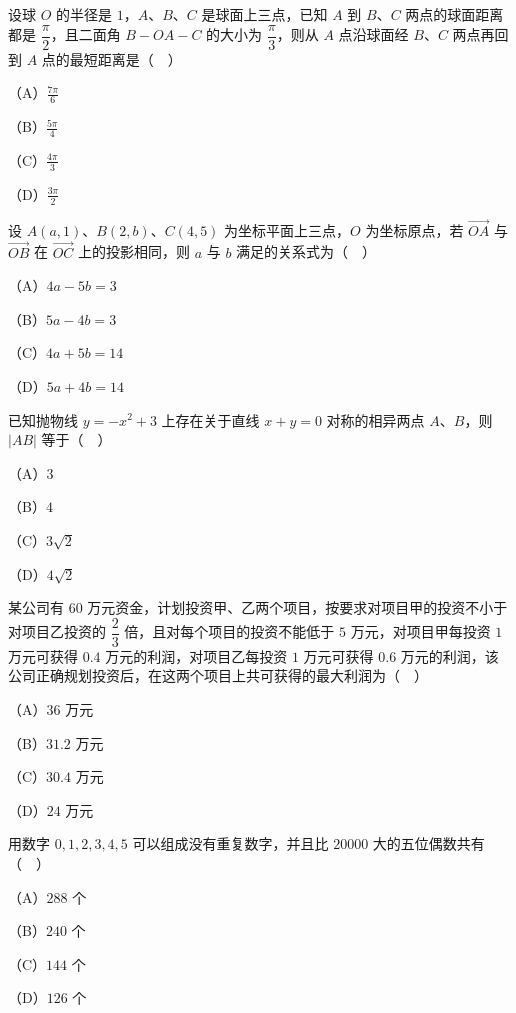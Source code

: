 \begin{question}
设球 $O$ 的半径是 $1$，$A$、$B$、$C$ 是球面上三点，已知 $A$ 到 $B$、$C$ 两点的球面距离都是 $\dfrac{\pi}{2}$，且二面角 $B-OA-C$ 的大小为 $\dfrac{\pi}{3}$，则从 $A$ 点沿球面经 $B$、$C$ 两点再回到 $A$ 点的最短距离是（　）
\nopagebreak[4]
\begin{center}\end{center}
\nopagebreak[4]
（A）$\frac{7\pi}{6}$

（B）$\frac{5\pi}{4}$

（C）$\frac{4\pi}{3}$

（D）$\frac{3\pi}{2}$

\end{question}
\begin{question}
设 $A(a,1)$、$B(2,b)$、$C(4,5)$ 为坐标平面上三点，$O$ 为坐标原点，若 $\overrightarrow{OA}$ 与 $\overrightarrow{OB}$ 在 $\overrightarrow{OC}$ 上的投影相同，则 $a$ 与 $b$ 满足的关系式为（　）

（A）$4a-5b=3$

（B）$5a-4b=3$

（C）$4a+5b=14$

（D）$5a+4b=14$

\end{question}
\begin{question}
已知抛物线 $y=-x^2+3$ 上存在关于直线 $x+y=0$ 对称的相异两点 $A$、$B$，则 $|AB|$ 等于（　）

（A）$3$

（B）$4$

（C）$3\sqrt2$

（D）$4\sqrt2$

\end{question}
\begin{question}
某公司有 $60$ 万元资金，计划投资甲、乙两个项目，按要求对项目甲的投资不小于对项目乙投资的 $\dfrac23$ 倍，且对每个项目的投资不能低于 $5$ 万元，对项目甲每投资 $1$ 万元可获得 $0.4$ 万元的利润，对项目乙每投资 $1$ 万元可获得 $0.6$ 万元的利润，该公司正确规划投资后，在这两个项目上共可获得的最大利润为（　）

（A）$36$ 万元

（B）$31.2$ 万元

（C）$30.4$ 万元

（D）$24$ 万元

\end{question}
\begin{question}
用数字 $0,1,2,3,4,5$ 可以组成没有重复数字，并且比 $20000$ 大的五位偶数共有（　）

（A）$288$ 个

（B）$240$ 个

（C）$144$ 个

（D）$126$ 个

\Needspace{0.4\textheight}
\end{question}
